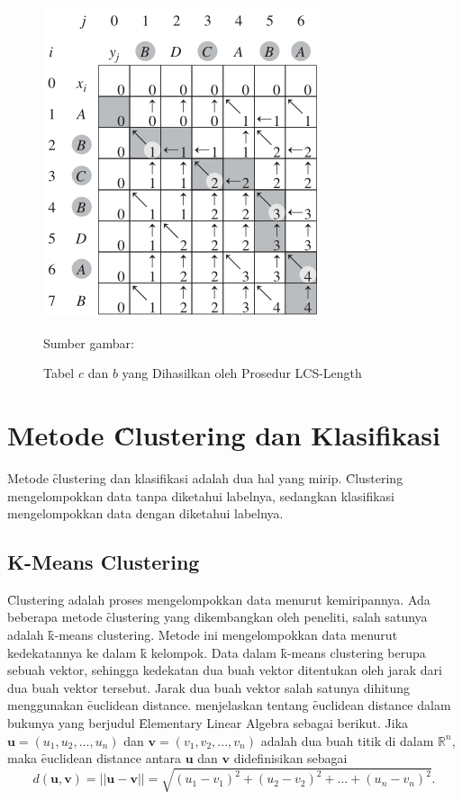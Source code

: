 \begin{figure}
  \centering
  \includegraphics[width=0.55\linewidth]{pics/tabel_lcs}
  \caption{Tabel $c$ dan $b$ yang Dihasilkan oleh Prosedur LCS-Length}{Sumber gambar: \cite{Cormen:2009:IAT:1614191}}
  \label{fig:tabellcs}
\end{figure}


\section{Metode \f{Clustering} dan Klasifikasi}
Metode \f{clustering} dan klasifikasi adalah dua hal yang mirip. \f{Clustering} mengelompokkan data tanpa diketahui labelnya, sedangkan klasifikasi mengelompokkan data dengan diketahui labelnya.

  \subsection{K-Means Clustering}
  \f{Clustering} adalah proses mengelompokkan data menurut kemiripannya. Ada beberapa metode \f{clustering} yang dikembangkan oleh peneliti, salah satunya adalah \f{k-means clustering}. Metode ini mengelompokkan data menurut kedekatannya ke dalam \f{k} kelompok. Data dalam \f{k-means clustering} berupa sebuah vektor, sehingga kedekatan dua buah vektor ditentukan oleh jarak dari dua buah vektor tersebut. Jarak dua buah vektor salah satunya dihitung menggunakan \f{euclidean distance}. \cite{anton2010elementary} menjelaskan tentang \f{euclidean distance} dalam bukunya yang berjudul \f{Elementary Linear Algebra} sebagai berikut. Jika $\mathbf{u} = (u_1,u_2,...,u_n)$ dan $\mathbf{v} = (v_1,v_2,...,v_n)$ adalah dua buah titik di dalam $\mathbb{R}^n$, maka \f{euclidean distance} antara $\mathbf{u}$ dan $\mathbf{v}$ didefinisikan sebagai
  \begin{equation} \label{equ:euclideandistance}
    d(\mathbf{u},\mathbf{v})=||\mathbf{u}-\mathbf{v}||=\sqrt{(u_1-v_1)^2+(u_2-v_2)^2+\dots+(u_n-v_n)^2}.
  \end{equation}
  

